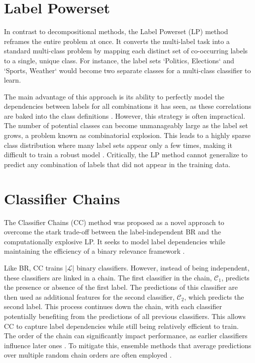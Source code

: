 \section{Label Powerset}
In contrast to decompositional methods, the Label Powerset (LP) method reframes the entire problem at once. It converts the multi-label task into a standard multi-class problem by mapping each distinct set of co-occurring labels to a single, unique class. For instance, the label sets `{Politics, Elections}` and `{Sports, Weather}` would become two separate classes for a multi-class classifier to learn. \cite{Read2011}

The main advantage of this approach is its ability to perfectly model the dependencies between labels for all combinations it has seen, as these correlations are baked into the class definitions \cite{Sucar2014Multi-label}. However, this strategy is often impractical. The number of potential classes can become unmanageably large as the label set grows, a problem known as combinatorial explosion. This leads to a highly sparse class distribution where many label sets appear only a few times, making it difficult to train a robust model \cite{Cherman2011}. Critically, the LP method cannot generalize to predict any combination of labels that did not appear in the training data.

\section{Classifier Chains}
The Classifier Chains (CC) method was proposed as a novel approach to overcome the stark trade-off between the label-independent BR and the computationally explosive LP. It seeks to model label dependencies while maintaining the efficiency of a binary relevance framework \cite{Read2011}.

Like BR, CC trains $|\mathcal{L}|$ binary classifiers. However, instead of being independent, these classifiers are linked in a chain. The first classifier in the chain, $\mathcal{C}_1$, predicts the presence or absence of the first label. The predictions of this classifier are then used as additional features for the second classifier, $\mathcal{C}_2$, which predicts the second label. This process continues down the chain, with each classifier potentially benefiting from the predictions of all previous classifiers. This allows CC to capture label dependencies while still being relatively efficient to train. \cite{Read2011} The order of the chain can significantly impact performance, as earlier classifiers influence later ones \cite{Read2021}. To mitigate this, ensemble methods that average predictions over multiple random chain orders are often employed \cite{Sucar2014Multi-label,Zhang2018}.


